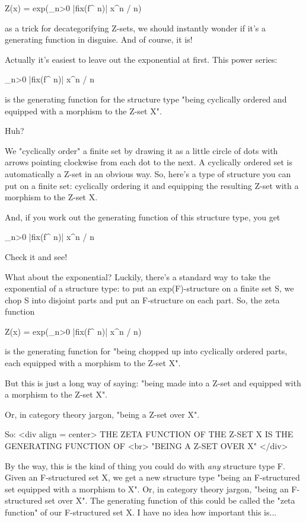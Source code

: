 Z(x) = exp(\sum_{n>0} |fix(f^{ n})| x^{n} / n)

as a trick for decategorifying Z-sets, we should instantly wonder if it's 
a generating function in disguise.  And of course, it is!

Actually it's easiest to leave out the exponential at first.  This power
series:

\sum_{n>0} |fix(f^{ n})| x^{n} / n

is the generating function for the structure type "being cyclically 
ordered and equipped with a morphism to the Z-set X".   

Huh?

We "cyclically order" a finite set by drawing it as a little circle of dots 
with arrows pointing clockwise from each dot to the next.  A cyclically 
ordered set is automatically a Z-set in an obvious way.   So, here's a type 
of structure you can put on a finite set: cyclically ordering it and 
equipping the resulting Z-set with a morphism to the Z-set X.  

And, if you work out the generating function of this structure type, you get 

\sum_{n>0} |fix(f^{ n})| x^{n} / n

Check it and see!  

What about the exponential?  Luckily, there's a standard way to take the 
exponential of a structure type: to put an exp(F)-structure on a finite set 
S, we chop S into disjoint parts and put an F-structure on each part.  So, 
the zeta function

Z(x) = exp(\sum_{n>0} |fix(f^{ n})| x^{n} / n)

is the generating function for "being chopped up into cyclically ordered 
parts, each equipped with a morphism to the Z-set X". 

But this is just a long way of saying: "being made into a Z-set
and equipped with a morphism to the Z-set X".

Or, in category theory jargon, "being a Z-set over X".

So: 
<div align = center>
     THE ZETA FUNCTION OF THE Z-SET X IS THE GENERATING FUNCTION OF <br>
                      "BEING A Z-SET OVER X"
</div>

By the way, this is the kind of thing you could do with \emph{any}
structure type F.  Given an F-structured set X, we get a new structure
type "being an F-structured set equipped with a morphism to
X".  Or, in category theory jargon, "being an F-structured
set over X".  The generating function of this could be called the
"zeta function" of our F-structured set X.  I have no idea
how important this is...

